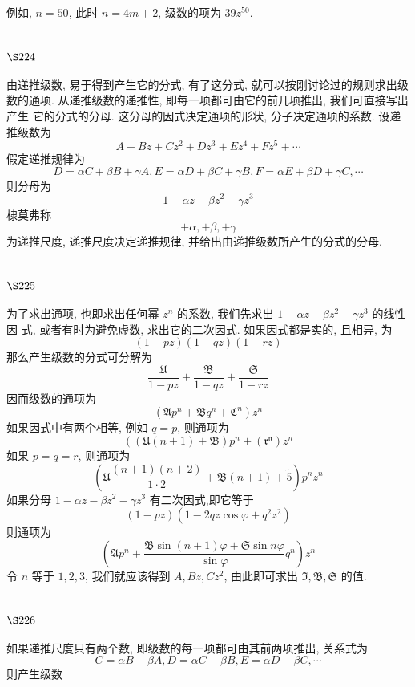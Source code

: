 例如, $n=50$, 此时 $n=4 m+2$, 级数的项为 $39 z^{50}$.

\section{$\S 224$}

由递推级数, 易于得到产生它的分式, 有了这分式, 就可以按刚讨论过的规则求出级数的通项. 从递推级数的递推性, 即每一项都可由它的前几项推出, 我们可直接写出产生 它的分式的分母. 这分母的因式决定通项的形状, 分子决定通项的系数. 设递推级数为
\[
A+B z+C z^{2}+D z^{3}+E z^{4}+F z^{5}+\cdots
\]
假定递推规律为
\[
D=\alpha C+\beta B+\gamma A, E=\alpha D+\beta C+\gamma B, F=\alpha E+\beta D+\gamma C, \cdots
\]
则分母为
\[
1-\alpha z-\beta z^{2}-\gamma z^{3}
\]
棣莫弗称
\[
+\alpha,+\beta,+\gamma
\]
为递推尺度, 递推尺度决定递推规律, 并给出由递推级数所产生的分式的分母.

\section{$\S 225$}

为了求出通项, 也即求出任何幂 $z^{n}$ 的系数, 我们先求出 $1-\alpha z-\beta z^{2}-\gamma z^{3}$ 的线性因 式, 或者有时为避免虚数, 求出它的二次因式. 如果因式都是实的, 且相异, 为
\[
(1-p z)(1-q z)(1-r z)
\]
那么产生级数的分式可分解为
\[
\frac{\mathfrak{U}}{1-p z}+\frac{\mathfrak{B}}{1-q z}+\frac{\mathfrak{S}}{1-r z}
\]
因而级数的通项为
\[
\left(\mathfrak{A} p^{n}+\mathfrak{B} q^{n}+\mathfrak{C}^{n}\right) z^{n}
\]
如果因式中有两个相等, 例如 $q=p$, 则通项为
\[
\left((\mathfrak{U}(n+1)+\mathfrak{B}) p^{n}+\left(\mathfrak{r ^ { n }}\right) z^{n}\right.
\]
如果 $p=q=r$, 则通项为
\[
\left(\mathfrak{U} \frac{(n+1)(n+2)}{1 \cdot 2}+\mathfrak{B}(n+1)+\widetilde{5}\right) p^{n} z^{n}
\]
如果分母 $1-\alpha z-\beta z^{2}-\gamma z^{3}$ 有二次因式,即它等于
\[
(1-p z)\left(1-2 q z \cos \varphi+q^{2} z^{2}\right)
\]
则通项为
\[
\left(\mathfrak{A} p^{n}+\frac{\mathfrak{B} \sin (n+1) \varphi+\mathfrak{S} \sin n \varphi}{\sin \varphi} q^{n}\right) z^{n}
\]
令 $n$ 等于 $1,2,3$, 我们就应该得到 $A, B z, C z^{2}$, 由此即可求出 $\mathfrak{I}, \mathfrak{B}, \mathfrak{S}$ 的值.

\section{$\S 226$}

如果递推尺度只有两个数, 即级数的每一项都可由其前两项推出, 关系式为
\[
C=\alpha B-\beta A, D=\alpha C-\beta B, E=\alpha D-\beta C, \cdots
\]
则产生级数 

